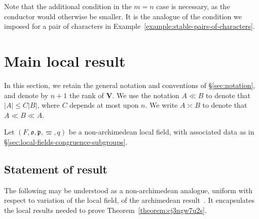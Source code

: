 \documentclass[reqno]{amsart}
\theoremstyle{plain} \newtheorem{theorem} {Theorem} \newtheorem{conjecture} {Conjecture} \newtheorem{corollary} [theorem] {Corollary} \newtheorem{proposition} [theorem] {Proposition} \newtheorem{fact} [theorem] {Fact}
\theoremstyle{definition} \newtheorem{definition} [theorem] {Definition}
\theoremstyle{itplain} %
\begin{document}
\begin{remark}
  Note that the additional condition in the $m=n$ case is necessary, as the conductor would otherwise be smaller.  It is the analogue of the condition we imposed for a pair of characters in Example~\ref{example:stable-pairs-of-characters}.
\end{remark}


\section{Main local result}\label{sec:mainlocal}
In this section, we retain the general notation and conventions of \S\ref{sec:notation}, and denote by $n+1$ the rank of $\mathbf{V}$.  We use the notation $A \ll B$ to denote that $\lvert A \rvert \leq C \lvert B \rvert$, where $C$ depends at most upon $n$.  We write $A \asymp B$ to denote that $A \ll B \ll A$.  

Let $(F,\mathfrak{o},\mathfrak{p},\varpi,q)$ be a non-archimedean local field, with associated data as in \S\ref{sec:local-fields-congruence-subgroups}.

\subsection{Statement of result}
The following may be understood as a non-archimedean analogue, uniform with respect to variation of the local field, of the archimedean result~\cite[Thm 4.2]{2020arXiv201202187N}.  It encapsulates the local results needed to prove Theorem~\ref{theorem:cj3ngw7u2s}.
\end{document}
